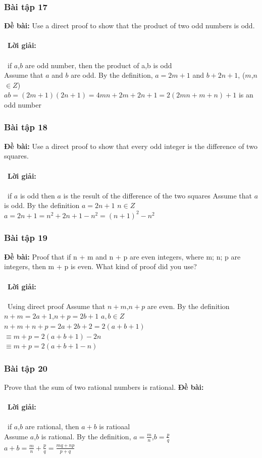 \documentclass[a4paper]{article}
\begin{document}
\subsubsection{Bài tập 17}
\textbf{Đề bài:} Use a direct proof to show that the product of two odd numbers is odd.
\\\ \\\
\textbf{Lời giải:} \\\ \\\
	if $a$,$b$ are odd number, then the product of a,b is odd\\
		Assume that $a$ and $b$ are odd. By the definition, $a=2m+1$ and $b+2n+1$, ($m$,$n$ $\in Z$)\\
		$ab=(2m+1)(2n+1)=4mn+2m+2n+1=2(2mn+m+n)+1$ is an odd number\\

\clearpage
\subsubsection{Bài tập 18}
\textbf{Đề bài:} Use a direct proof to show that every odd integer is the difference of two squares.
\\\ \\\
\textbf{Lời giải:} \\\ \\\
	if $a$ is odd then $a$ is the result of the difference of the two squares
		Assume that $a$ is odd. By the definition $a=2n+1$ $n \in Z$	
		$a=2n+1=n^{2}+2n+1-n^{2}=(n+1)^{2}-n^{2}$\\

\clearpage
\subsubsection{Bài tập 19}
\textbf{Đề bài:} Proof that if n + m and n + p are even integers, where m; n; p are integers, then m + p is even. What
kind of proof did you use?
\\\ \\\
\textbf{Lời giải:} \\\ \\\
Using direct proof
		Assume that $n+m$,$n+p$ are even. By the definition $n+m=2a+1$,$n+p=2b+1$ $a,b \in Z$
		$n+m+n+p=2a+2b+2=2(a+b+1)$\\
		$\equiv m+p=2(a+b+1)-2n$\\
		$\equiv m+p=2(a+b+1-n)$\\
\clearpage
\subsubsection{Bài tập 20} Prove that the sum of two rational numbers is rational.
\textbf{Đề bài:} 
\\\ \\\
\textbf{Lời giải:} \\\ \\\
if $a$,$b$ are rational, then $a+b$ is ratioaal\\
		Assume $a$,$b$ is rational. By the definition, $a=\frac{m}{n}$,$b=\frac{p}{q}$\\
		$a+b=\frac{m}{n}+\frac{p}{q}=\frac{mq+np}{p+q}$\\
\end{document}
